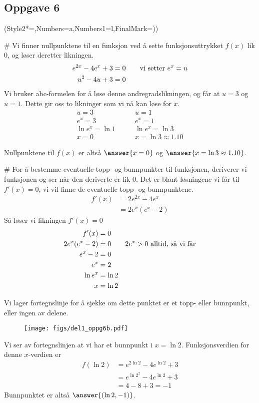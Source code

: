 	
\subsection*{Oppgave 6}

\begin{easylist}[enumerate]
	\ListProperties(Style2*=,Numbers=a,Numbers1=l,FinalMark={)})
	
	# Vi finner nullpunktene til en funksjon ved å sette funksjonsuttrykket $f(x)$ lik $0$, og løser deretter likningen.
	\begin{align*}
		e^{2x} - 4e^{x} + 3 &= 0 \qquad \textnormal{vi setter $e^x = u$}\\ 
		u^2 - 4u + 3 &= 0
	\end{align*}
	Vi bruker abc-formelen for å løse denne andregradslikningen, og får at $u = 3$ og $u = 1$. Dette gir oss to likninger som vi nå kan løse for $x$.
	\begin{align*}
		u = 3 & \qquad u = 1 \\
		e^x = 3 & \qquad e^x = 1 \\
		\ln e^x = \ln 1 & \qquad \ln e^x = \ln 3\\
		x = 0 & \qquad x = \ln 3 \approx 1.10
	\end{align*}
	
	Nullpunktene til $f(x)$ er altså $	\answer{x = 0}$ og $\answer{x = \ln 3 \approx 1.10}$.
	
	# For å bestemme eventuelle topp- og bunnpunkter til funksjonen, deriverer vi funksjonen og ser når den deriverte er lik $0$. 
	Det er blant løsningene vi får til $f'(x) = 0$, vi vil finne de eventuelle topp- og bunnpunktene.
	\begin{align*}
		f'(x) &= 2e^{2x} - 4e^x \\
		& = 2e^x(e^x - 2)
	\end{align*}
	Så løser vi likningen $f'(x) = 0$
	\begin{align*}
		f'(x) & = 0 \\
		2e^x(e^x - 2) & = 0 \qquad \textnormal{$2e^x > 0$ alltid, så vi får}\\
		e^x - 2 & = 0 \\
		e^x & = 2 \\
		\ln e^x &=  \ln 2\\
		x & = \ln 2
	\end{align*}
	
	Vi lager fortegnslinje for å sjekke om dette punktet er et topp- eller bunnpunkt, eller ingen av delene.
	\begin{figure}[ht!]
		\centering
		\texttt{[image: figs/del1\_oppg6b.pdf]}
		\label{fig:del1_oppg6b}
	\end{figure}
	Vi ser av fortegnslinjen at vi har et bunnpunkt i $x = \ln 2$. Funksjonsverdien for denne $x$-verdien er
	\begin{align*}
		f(\ln 2) & = e^{2\ln2} - 4e^{\ln 2} + 3\\
		& = e^{\ln 2^2} - 4e^{\ln 2} + 3 \\
		& = 4 - 8 + 3 = -1
	\end{align*}
	Bunnpunktet er altså $\answer{(\ln 2, -1)}$.
	

\end{easylist}
